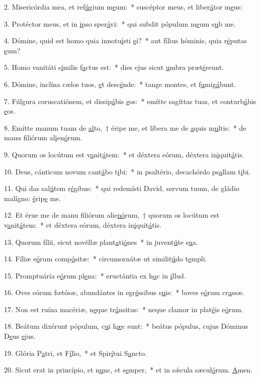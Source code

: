 2. Misericórdia mea, et ref\uline{ú}gium m\uline{e}um:~* suscéptor meus, et liber\uline{á}tor m\uline{e}us:\par 
3. Protéctor meus, et in \uline{i}pso sper\uline{á}vi:~* qui subdit pópulum m\uline{e}um s\uline{u}b me.\par 
4. Dómine, quid est homo quia innotu\uline{í}sti \uline{e}i?~* aut fílius hóminis, quia r\uline{é}putas \uline{e}um?\par 
5. Homo vanitáti s\uline{í}milis f\uline{a}ctus est:~* dies ejus sicut \uline{u}mbra præt\uline{é}reunt.\par 
6. Dómine, inclína cælos tuos, \uline{e}t desc\uline{é}nde:~* tange montes, et f\uline{u}mig\uline{á}bunt.\par 
7. Fúlgura coruscatiónem, et dissip\uline{á}bis \uline{e}os:~* emítte sagíttas tuas, et conturb\uline{á}bis \uline{e}os.\par 
8. Emítte manum tuam de \uline{al}to,~† éripe me, et líbera me de \uline{a}quis m\uline{u}ltis:~* de manu filiórum al\uline{i}en\uline{ó}rum.\par 
9. Quorum os locútum est v\uline{a}nit\uline{á}tem:~* et déxtera eórum, déxtera in\uline{i}quit\uline{á}tis.\par 
10. Deus, cánticum novum cant\uline{á}bo t\uline{i}bi:~* in psaltério, decachórdo ps\uline{a}llam t\uline{i}bi.\par 
11. Qui das sal\uline{ú}tem r\uline{é}gibus:~* qui redemísti David, servum tuum, de gládio malígno: \uline{é}rip\uline{e} me.\par 
12. Et érue me de manu filiórum alie\uline{nó}rum,~† quorum os locútum est v\uline{a}nit\uline{á}tem:~* et déxtera eórum, déxtera in\uline{i}quit\uline{á}tis.\par 
13. Quorum fílii, sicut novéllæ plant\uline{a}ti\uline{ó}nes~* in juvent\uline{ú}te s\uline{u}a.\par 
14. Fíliæ e\uline{ó}rum comp\uline{ó}sitæ:~* circumornátæ ut similit\uline{ú}do t\uline{e}mpli.\par 
15. Promptuária e\uline{ó}rum pl\uline{e}na:~* eructántia ex h\uline{o}c in \uline{i}llud.\par 
16. Oves eórum fœtósæ, abundántes in egr\uline{é}ssibus s\uline{u}is:~* boves e\uline{ó}rum cr\uline{a}ssæ.\par 
17. Non est ruína macériæ, n\uline{e}que tr\uline{á}nsitus:~* neque clamor in plat\uline{é}is e\uline{ó}rum.\par 
18. Beátum dixérunt pópulum, c\uline{u}i h\uline{æ}c sunt:~* beátus pópulus, cujus Dóminus D\uline{e}us \uline{e}jus.\par 
19. Glória P\uline{a}tri, et F\uline{í}lio,~* et Spir\uline{í}tui S\uline{a}ncto.\par 
20. Sicut erat in princípio, et n\uline{u}nc, et s\uline{e}mper,~* et in sǽcula sæcul\uline{ó}rum. \uline{A}men.\par 
